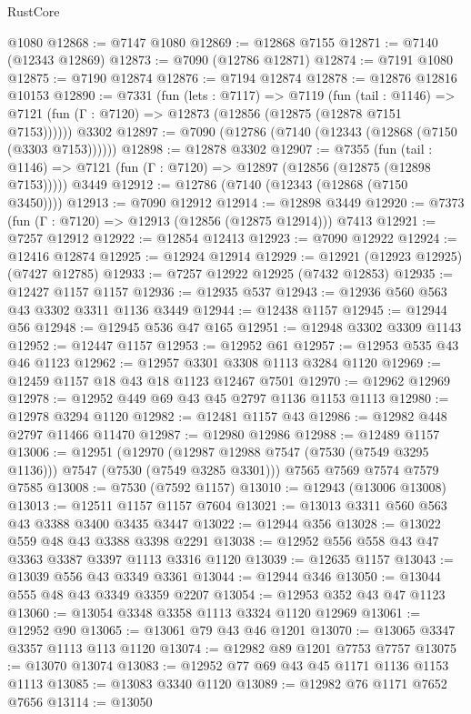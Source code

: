 \begin{lexlean}{RustCore}
\begin{coremodule}
    @1080
@12868 := @7147 @1080
@12869 := @12868 @7155
@12871 := @7140 (@12343 @12869)
@12873 := @7090 (@12786 @12871)
@12874 := @7191 @1080
@12875 := @7190 @12874
@12876 := @7194 @12874
@12878 := @12876 @12816 @10153
@12890 := @7331
    (fun (lets : @7117) =>
    @7119
      (fun (tail : @1146) =>
      @7121 (fun (Γ : @7120) => @12873 (@12856 (@12875 (@12878 @7151 @7153))))))
    @3302
@12897 := @7090 (@12786 (@7140 (@12343 (@12868 (@7150 (@3303 @7153))))))
@12898 := @12878 @3302
@12907 := @7355
    (fun (tail : @1146) => @7121 (fun (Γ : @7120) => @12897 (@12856 (@12875 (@12898 @7153)))))
    @3449
@12912 := @12786 (@7140 (@12343 (@12868 (@7150 @3450))))
@12913 := @7090 @12912
@12914 := @12898 @3449
@12920 := @7373 (fun (Γ : @7120) => @12913 (@12856 (@12875 @12914))) @7413
@12921 := @7257 @12912
@12922 := @12854 @12413
@12923 := @7090 @12922
@12924 := @12416 @12874
@12925 := @12924 @12914
@12929 := @12921 (@12923 @12925) (@7427 @12785)
@12933 := @7257 @12922 @12925 (@7432 @12853)
@12935 := @12427 @1157 @1157
@12936 := @12935 @537
@12943 := @12936 @560 @563 @43 @3302 @3311 @1136 @3449
@12944 := @12438 @1157
@12945 := @12944 @56
@12948 := @12945 @536 @47 @165
@12951 := @12948 @3302 @3309 @1143
@12952 := @12447 @1157
@12953 := @12952 @61
@12957 := @12953 @535 @43 @46 @1123
@12962 := @12957 @3301 @3308 @1113 @3284 @1120
@12969 := @12459 @1157 @18 @43 @18 @1123 @12467 @7501
@12970 := @12962 @12969
@12978 := @12952 @449 @69 @43 @45 @2797 @1136 @1153 @1113
@12980 := @12978 @3294 @1120
@12982 := @12481 @1157 @43
@12986 := @12982 @448 @2797 @11466 @11470
@12987 := @12980 @12986
@12988 := @12489 @1157
@13006 := @12951
    (@12970 (@12987 @12988 @7547 (@7530 (@7549 @3295 @1136))) @7547 (@7530 (@7549 @3285 @3301)))
    @7565
    @7569
    @7574
    @7579
    @7585
@13008 := @7530 (@7592 @1157)
@13010 := @12943 (@13006 @13008)
@13013 := @12511 @1157 @1157 @7604
@13021 := @13013 @3311 @560 @563 @43 @3388 @3400 @3435 @3447
@13022 := @12944 @356
@13028 := @13022 @559 @48 @43 @3388 @3398 @2291
@13038 := @12952 @556 @558 @43 @47 @3363 @3387 @3397 @1113 @3316 @1120
@13039 := @12635 @1157
@13043 := @13039 @556 @43 @3349 @3361
@13044 := @12944 @346
@13050 := @13044 @555 @48 @43 @3349 @3359 @2207
@13054 := @12953 @352 @43 @47 @1123
@13060 := @13054 @3348 @3358 @1113 @3324 @1120 @12969
@13061 := @12952 @90
@13065 := @13061 @79 @43 @46 @1201
@13070 := @13065 @3347 @3357 @1113 @113 @1120
@13074 := @12982 @89 @1201 @7753 @7757
@13075 := @13070 @13074
@13083 := @12952 @77 @69 @43 @45 @1171 @1136 @1153 @1113
@13085 := @13083 @3340 @1120
@13089 := @12982 @76 @1171 @7652 @7656
@13114 := @13050

\end{coremodule}
\end{lexlean}
